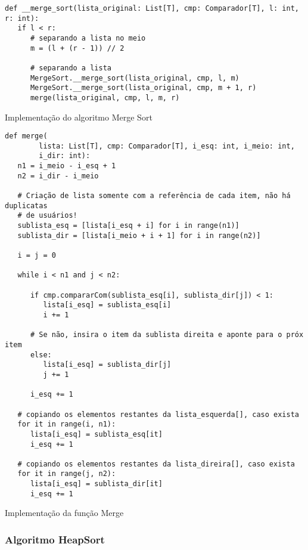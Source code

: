 \documentclass[a4paper,12pt]{scrartcl}
\begin{document}
\begin{listing}[H]
\begin{verbatim}
def __merge_sort(lista_original: List[T], cmp: Comparador[T], l: int, r: int):
   if l < r:
      # separando a lista no meio
      m = (l + (r - 1)) // 2

      # separando a lista
      MergeSort.__merge_sort(lista_original, cmp, l, m)
      MergeSort.__merge_sort(lista_original, cmp, m + 1, r)
      merge(lista_original, cmp, l, m, r)
\end{verbatim}
\caption{\footnotesize{Implementação do algoritmo Merge Sort}}
\end{listing}

\begin{listing}[H]
\begin{verbatim}
def merge(
        lista: List[T], cmp: Comparador[T], i_esq: int, i_meio: int,
        i_dir: int):
   n1 = i_meio - i_esq + 1
   n2 = i_dir - i_meio

   # Criação de lista somente com a referência de cada item, não há duplicatas
   # de usuários!
   sublista_esq = [lista[i_esq + i] for i in range(n1)]
   sublista_dir = [lista[i_meio + i + 1] for i in range(n2)]

   i = j = 0

   while i < n1 and j < n2:

      if cmp.compararCom(sublista_esq[i], sublista_dir[j]) < 1:
         lista[i_esq] = sublista_esq[i]
         i += 1

      # Se não, insira o item da sublista direita e aponte para o próx item
      else:
         lista[i_esq] = sublista_dir[j]
         j += 1

      i_esq += 1

   # copiando os elementos restantes da lista_esquerda[], caso exista
   for it in range(i, n1):
      lista[i_esq] = sublista_esq[it]
      i_esq += 1

   # copiando os elementos restantes da lista_direira[], caso exista
   for it in range(j, n2):
      lista[i_esq] = sublista_dir[it]
      i_esq += 1
\end{verbatim}
\caption{\footnotesize{Implementação da função Merge}}
\end{listing}

\subsubsection{Algoritmo HeapSort}
\end{document}
